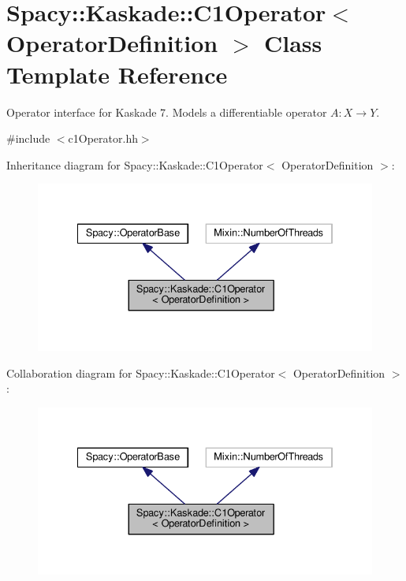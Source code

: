 \hypertarget{classSpacy_1_1Kaskade_1_1C1Operator}{}\section{Spacy\+:\+:Kaskade\+:\+:C1\+Operator$<$ Operator\+Definition $>$ Class Template Reference}
\label{classSpacy_1_1Kaskade_1_1C1Operator}


Operator interface for Kaskade 7. Models a differentiable operator $A:X\rightarrow Y$.  




{\ttfamily \#include $<$c1\+Operator.\+hh$>$}



Inheritance diagram for Spacy\+:\+:Kaskade\+:\+:C1\+Operator$<$ Operator\+Definition $>$\+:
\nopagebreak
\begin{figure}[H]
\begin{center}
\leavevmode
\includegraphics[width=334pt]{classSpacy_1_1Kaskade_1_1C1Operator__inherit__graph}
\end{center}
\end{figure}


Collaboration diagram for Spacy\+:\+:Kaskade\+:\+:C1\+Operator$<$ Operator\+Definition $>$\+:
\nopagebreak
\begin{figure}[H]
\begin{center}
\leavevmode
\includegraphics[width=334pt]{classSpacy_1_1Kaskade_1_1C1Operator__coll__graph}
\end{center}
\end{figure}
